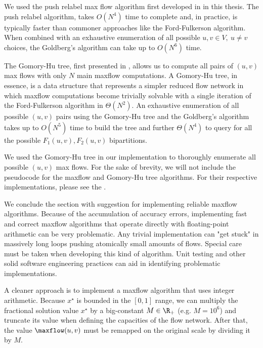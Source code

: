 \medskip

We used the push relabel max flow algorithm first developed in \cite{goldberg1997} in this thesis.
The push relabel algorithm,
takes $O(N^4)$ time to complete and, in practice,
is typically faster than commoner approaches like the Ford-Fulkerson algorithm.
When combined with an exhaustive enumeration of all possible $u, v \in V,\ u \ne v$ choices,
the Goldberg's algorithm can take up to $O(N^6)$ time.

The Gomory-Hu tree, first presented in \cite{gomory1961},
allows us to compute all pairs of $(u, v)$ max flows with only $N$ main maxflow computations.
A Gomory-Hu tree, in essence, is a data structure that represents a simpler reduced flow network
in which maxflow computations become trivially solvable
with a single iteration of the Ford-Fulkerson algorithm in $\Theta(N^2)$.
An exhaustive enumeration of all possible $(u, v)$ pairs using the Gomory-Hu tree
and the Goldberg's algorithm takes up to $O(N^5)$ time to build the tree
and further $\Theta(N^4)$ to query for all the possible $F_1(u, v), F_2(u, v)$ bipartitions.

We used the Gomory-Hu tree in our implementation to thoroughly enumerate all possible $(u, v)$ max flows.
For the sake of brevity, we will not include the pseudocode for the maxflow and Gomory-Hu tree algorithms.
For their respective implementations,
please see the .

\medskip

We conclude the section with suggestion for implementing reliable maxflow algorithms.
Because of the accumulation of accuracy errors,
implementing fast and correct maxflow algorithms
that operate directly with floating-point arithmetic can be very problematic.
Any trivial implementation can "get stuck" in massively long loops
pushing atomically small amounts of flows.
Special care must be taken when developing this kind of algorithm.
Unit testing and other solid software engineering practices
can aid in identifying problematic implementations.

A cleaner approach is to implement a maxflow algorithm that uses integer arithmetic.
Because $x^\star$ is bounded in the $[0, 1]$ range,
we can multiply the fractional solution value $x^\star$ by a big-constant $M \in \R_{+}$ (e.g. $M = 10^6$)
and truncate its value when defining the capacities of the flow network.
After that, the value $\maxflow(u, v)$ must be remapped on the original scale by dividing it by $M$.


